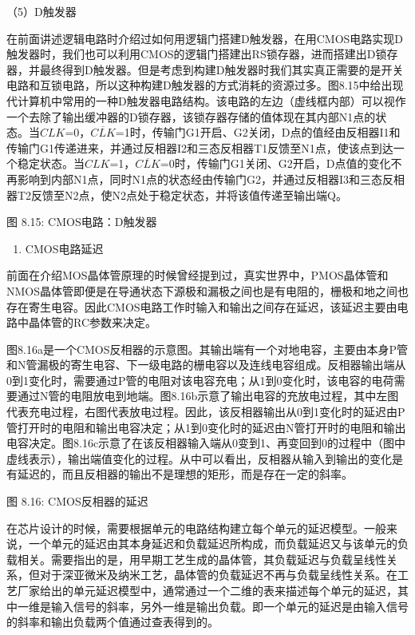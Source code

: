 \documentclass[]{ctexbook}
\providecommand{\tightlist}{%
  \setlength{\itemsep}{0pt}\setlength{\parskip}{0pt}}
\begin{document}
（5）D触发器

在前面讲述逻辑电路时介绍过如何用逻辑门搭建D触发器，在用CMOS电路实现D触发器时，我们也可以利用CMOS的逻辑门搭建出RS锁存器，进而搭建出D锁存器，并最终得到D触发器。但是考虑到构建D触发器时我们其实真正需要的是开关电路和互锁电路，所以这种构建D触发器的方式消耗的资源过多。图8.15中给出现代计算机中常用的一种D触发器电路结构。该电路的左边（虚线框内部）可以视作一个去除了输出缓冲器的D锁存器，该锁存器存储的值体现在其内部N1点的状态。当\(CLK\)=0，\(\overline{CLK}\)=1时，传输门G1开启、G2关闭，D点的值经由反相器I1和传输门G1传递进来，并通过反相器I2和三态反相器T1反馈至N1点，使该点到达一个稳定状态。当\(CLK\)=1，\(\overline{CLK}\)=0时，传输门G1关闭、G2开启，D点值的变化不再影响到内部N1点，同时N1点的状态经由传输门G2，并通过反相器I3和三态反相器T2反馈至N2点，使N2点处于稳定状态，并将该值传递至输出端Q。

图 8.15: CMOS电路：D触发器

\begin{enumerate}
\def\labelenumi{\arabic{enumi}.}
\setcounter{enumi}{2}
\tightlist
\item
  CMOS电路延迟
\end{enumerate}

前面在介绍MOS晶体管原理的时候曾经提到过，真实世界中，PMOS晶体管和NMOS晶体管即便是在导通状态下源极和漏极之间也是有电阻的，栅极和地之间也存在寄生电容。因此CMOS电路工作时输入和输出之间存在延迟，该延迟主要由电路中晶体管的RC参数来决定。

图8.16a是一个CMOS反相器的示意图。其输出端有一个对地电容，主要由本身P管和N管漏极的寄生电容、下一级电路的栅电容以及连线电容组成。反相器输出端从0到1变化时，需要通过P管的电阻对该电容充电；从1到0变化时，该电容的电荷需要通过N管的电阻放电到地端。图8.16b示意了输出电容的充放电过程，其中左图代表充电过程，右图代表放电过程。因此，该反相器输出从0到1变化时的延迟由P管打开时的电阻和输出电容决定；从1到0变化时的延迟由N管打开时的电阻和输出电容决定。图8.16c示意了在该反相器输入端从0变到1、再变回到0的过程中（图中虚线表示），输出端值变化的过程。从中可以看出，反相器从输入到输出的变化是有延迟的，而且反相器的输出不是理想的矩形，而是存在一定的斜率。

图 8.16: CMOS反相器的延迟

在芯片设计的时候，需要根据单元的电路结构建立每个单元的延迟模型。一般来说，一个单元的延迟由其本身延迟和负载延迟所构成，而负载延迟又与该单元的负载相关。需要指出的是，用早期工艺生成的晶体管，其负载延迟与负载呈线性关系，但对于深亚微米及纳米工艺，晶体管的负载延迟不再与负载呈线性关系。在工艺厂家给出的单元延迟模型中，通常通过一个二维的表来描述每个单元的延迟，其中一维是输入信号的斜率，另外一维是输出负载。即一个单元的延迟是由输入信号的斜率和输出负载两个值通过查表得到的。
\end{document}
